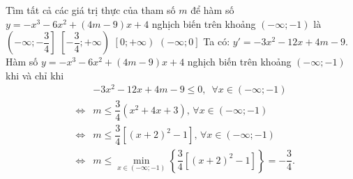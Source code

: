 \begin{ex}%
	Tìm tất cả các giá trị thực của tham số $ m$ để hàm số $ y=-x^3-6x^2+\left(4m-9\right)x+4$ nghịch biến trên khoảng $\left(-\infty;-1\right)$ là
	\choice
	{\True $\left(-\infty ;-\dfrac{3}{4}\right]$}
	{$\left[-\dfrac{3}{4};+\infty\right)$}
	{$\left[0;+\infty\right)$}
	{$\left(-\infty ;0\right]$}
	\loigiai
	{Ta có: $ y'=-3x^2-12x+4m-9$.\\
		Hàm số $ y=-x^3-6x^2+\left(4m-9\right)x+4$ nghịch biến trên khoảng $\left(-\infty;-1\right)$ khi và chỉ khi
		\begin{eqnarray*}
			& &-3x^2-12x+4m-9\le 0,\,\,\,\forall x\in\left(-\infty ;-1\right)\\
			&\Leftrightarrow& m\le\dfrac{3}{4}\left(x^2+4x+3\right),\,\forall x\in\left(-\infty ;-1\right)\\ 
			&\Leftrightarrow& m\le\dfrac{3}{4}\left[\left(x+2\right)^2-1\right],\,\forall x\in\left(-\infty ;-1\right)\\
			&\Leftrightarrow &m\le\min\limits_{x\in\left(-\infty ;-1\right)}\left\{{\dfrac{3}{4}\left[\left(x+2\right)^2-1\right]}\right\}=-\dfrac{3}{4}.
		\end{eqnarray*}
	}
\end{ex}


